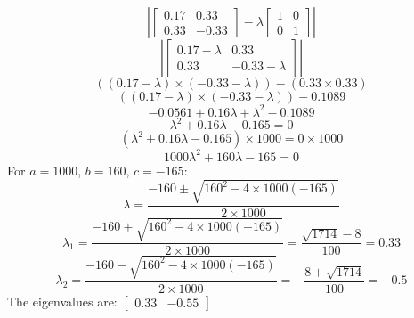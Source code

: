 \documentclass[12pt,a4paper]{paper}
\begin{document}
\begin{enumerate}
\begin{enumerate}
\begin{equation}
\end{equation}
\begin{equation}
\left|\left[\begin{array}{cc}0.17 & 0.33 \\ 0.33 & -0.33\end{array}\right]-\lambda \left[\begin{array}{cc}1 & 0 \\0 & 1\end{array}\right]\right|
\end{equation}
\begin{equation}
\left|\left[\begin{array}{cc}0.17-\lambda & 0.33 \\ 0.33 & -0.33-\lambda\end{array}\right]\right|
\end{equation}
\begin{equation}
\left(\left(0.17 - \lambda \right) \times \left(-0.33- \lambda \right)\right) - \left(0.33 \times 0.33\right)
\end{equation}
\begin{equation}
\left(\left(0.17 - \lambda \right) \times \left(-0.33- \lambda \right)\right) - 0.1089
\end{equation}
\begin{equation}
-0.0561 + 0.16\lambda + \lambda^2 - 0.1089
\end{equation}
\begin{equation}
\lambda^2 + 0.16\lambda - 0.165 = 0
\end{equation}
\begin{equation}
\left(\lambda^2 + 0.16\lambda - 0.165\right) \times 1000 = 0 \times 1000
\end{equation}
\begin{equation}
1000\lambda ^2 + 160\lambda - 165=0
\end{equation}
For $a=1000$, $b=160$, $c=-165$:
\begin{equation}
\lambda = \frac{-160\pm\sqrt{160^2-4 \times 1000\left(-165\right)}}{2 \times 1000}
\end{equation}
\begin{equation}
\lambda_{1} = \frac{-160+\sqrt{160^2-4 \times 1000\left(-165\right)}}{2 \times 1000} = \frac{\sqrt{1714}-8}{100} = 0.33
\end{equation}
\begin{equation}
\lambda_{2} = \frac{-160-\sqrt{160^2-4 \times 1000\left(-165\right)}}{2 \times 1000} = -\frac{8 + \sqrt{1714}}{100} = -0.5
\end{equation}
The eigenvalues are: $\left[\begin{array}{cc} 0.33 & -0.55 \end{array}\right]$


\end{enumerate}
\end{enumerate}
\end{document}
